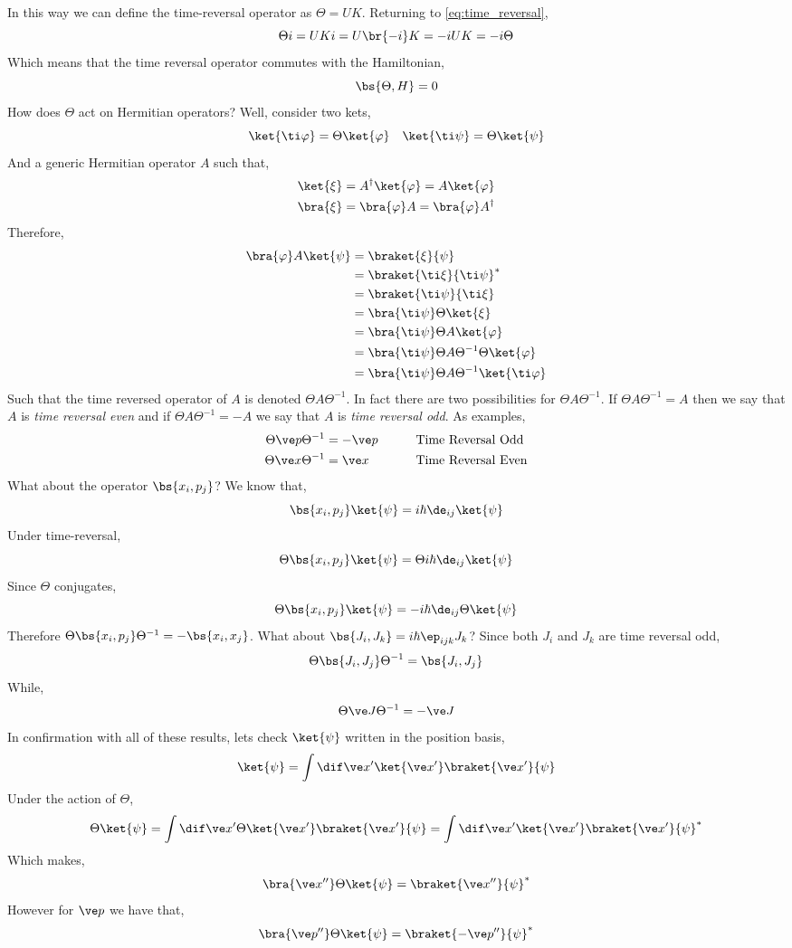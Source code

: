\documentclass{article}
\begin{document}
In this way we can define the time-reversal operator as $\Theta = U K$. Returning to \cref{eq:time_reversal},
\[ \Theta i = U K i = U \br{-i} K = - i U K = - i \Theta \]
Which means that the time reversal operator commutes with the Hamiltonian,
\[ \bs{\Theta, H} = 0 \]
How does $\Theta$ act on Hermitian operators? Well, consider two kets,
\[ \ket{\ti \varphi} = \Theta \ket{\varphi} \quad \ket{\ti \psi} = \Theta \ket{\psi} \]
And a generic Hermitian operator $A$ such that,
\begin{align*}
\ket{\xi} &= A^{\dagger} \ket{\varphi} = A \ket{\varphi} \\
\bra{\xi} &= \bra{\varphi}A = \bra{\varphi}A^{\dagger}
\end{align*}
Therefore,
\begin{align*}
    \bra{\varphi} A \ket{\psi}
    &= \braket{\xi}{\psi} \\
    &= \braket{\ti \xi}{\ti \psi}^* \\
    &= \braket{\ti \psi}{\ti \xi} \\
    &= \bra{\ti \psi}\Theta\ket{\xi} \\
    &= \bra{\ti \psi}\Theta A\ket{\varphi} \\
    &= \bra{\ti \psi}\Theta A \Theta^{-1} \Theta \ket{\varphi} \\
    &= \bra{\ti \psi}\Theta A \Theta^{-1} \ket{\ti \varphi}
\end{align*}
Such that the time reversed operator of $A$ is denoted $\Theta A \Theta^{-1}$. In fact there are two possibilities for $\Theta A \Theta^{-1}$. If $\Theta A \Theta^{-1} = A$ then we say that $A$ is \textit{time reversal even} and if $\Theta A \Theta^{-1} = - A$ we say that $A$ is \textit{time reversal odd}. As examples,
\begin{alignat*}{2}
    \Theta \ve p \Theta^{-1} &= - \ve p \qquad &&\text{Time Reversal Odd} \\
    \Theta \ve x \Theta^{-1} &= \ve x \qquad &&\text{Time Reversal Even}
\end{alignat*}
What about the operator $\bs{x_i, p_j}$? We know that,
\[ \bs{x_i, p_j} \ket{\psi} = i\hbar \de_{ij} \ket{\psi} \]
Under time-reversal,
\[ \Theta \bs{x_i, p_j} \ket{\psi} = \Theta i\hbar \de_{ij} \ket{\psi} \]
Since $\Theta$ conjugates,
\[ \Theta \bs{x_i, p_j} \ket{\psi} = - i\hbar \de_{ij} \Theta \ket{\psi} \]
Therefore $\Theta \bs{x_i, p_j} \Theta^{-1} = - \bs{x_i, x_j}$. What about $\bs{J_i, J_k} = i \hbar \ep_{ijk} J_k$? Since both $J_i$ and $J_k$ are time reversal odd,
\[ \Theta \bs{J_i, J_j} \Theta^{-1} = \bs{J_i, J_j} \]
While,
\[ \Theta \ve J \Theta^{-1} = - \ve J \]
In confirmation with all of these results, lets check $\ket{\psi}$ written in the position basis,
\[ \ket{\psi} = \int \dif \ve x' \ket{\ve x'}\braket{\ve x'}{\psi} \]
Under the action of $\Theta$,
\[ \Theta \ket{\psi} = \int \dif \ve x' \Theta \ket{\ve x'}\braket{\ve x'}{\psi} = \int \dif \ve x' \ket{\ve x'}\braket{\ve x'}{\psi}^* \]
Which makes,
\[ \bra{\ve x''}\Theta \ket{\psi} = \braket{\ve x''}{\psi}^* \]
However for $\ve p$ we have that,
\[ \bra{\ve p''}\Theta \ket{\psi} = \braket{-\ve p''}{\psi}^* \]
\end{document}
